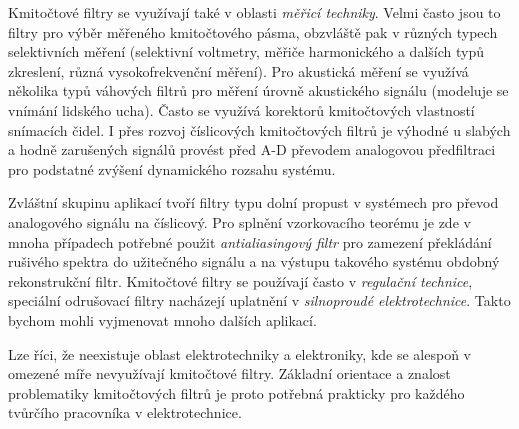         Kmitočtové filtry se využívají také v oblasti \emph{měřicí techniky}. Velmi často jsou to
        filtry pro výběr měřeného kmitočtového pásma, obzvláště pak v různých typech selektivních
        měření (selektivní voltmetry, měřiče harmonického a dalších typů zkreslení, různá
        vysokofrekvenční měření). Pro akustická měření se využívá několika typů váhových filtrů pro
        měření úrovně akustického signálu (modeluje se vnímání lidského ucha). Často se využívá
        korektorů kmitočtových vlastností snímacích čidel. I přes rozvoj číslicových kmitočtových
        filtrů je výhodné u slabých a hodně zarušených signálů provést před A-D převodem analogovou
        předfiltraci pro podstatné zvýšení dynamického rozsahu systému.

        Zvláštní skupinu aplikací tvoří filtry typu dolní propust v systémech pro převod analogového
        signálu na číslicový. Pro splnění vzorkovacího teorému je zde v mnoha případech potřebné
        použit \emph{antialiasingový filtr} pro zamezení překládání rušivého spektra do užitečného
        signálu a na výstupu takového systému obdobný rekonstrukční filtr. Kmitočtové filtry se
        používají často v \emph{regulační technice}, speciální odrušovací filtry nacházejí uplatnění
        v \emph{silnoproudé elektrotechnice}. Takto bychom mohli vyjmenovat mnoho dalších aplikací.

        Lze říci, že neexistuje oblast elektrotechniky a elektroniky, kde se alespoň v omezené míře
        nevyužívají kmitočtové filtry. Základní orientace a znalost problematiky kmitočtových filtrů
        je proto potřebná prakticky pro každého tvůrčího pracovníka v elektrotechnice.
    
